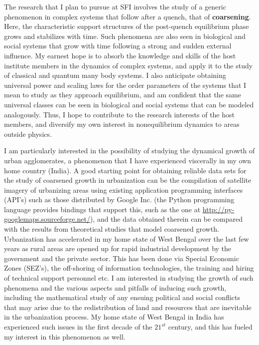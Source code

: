 \documentclass[a4paper,9pt]{article}
\begin{document}
The research that I plan to pursue at SFI involves the study of a generic phenomenon in complex systems that follow after a quench, that of \textbf{coarsening}. Here, the characteristic support structures of the post-quench equilibrium phase grows and stabilizes with time. Such phenomena are also seen in biological and social systems that grow with time following a strong and sudden external influence. My earnest hope is to absorb the knowledge and skills of the host institute members in the dynamics of complex systems, and apply it to the study of classical and quantum many body systems. I also anticipate obtaining universal power and scaling laws for the order parameters of the systems that I mean to study as they approach equilibrium, and am confident that the same universal classes can be seen in biological and social systems that can be modeled analogously. Thus, I hope to contribute to the research interests of the host members, and diversify my own interest in nonequilibrium dynamics to areas outside physics. 

I am particularly interested in the possibility of studying the dynamical growth of urban agglomerates, a phenomenon that I have experienced viscerally in my own home country (India). A good starting point for obtaining reliable data sets for the study of coarsened growth in urbanization can be the compilation of satellite imagery of urbanizing areas using existing application programming interfaces (API's) such as those distributed by Google Inc. (the Python programming language provides bindings that support this, such as the one at \url{http://py-googlemaps.sourceforge.net/}), and the data obtained therein can be compared with the results from theoretical studies that model coarsened growth. Urbanization has accelerated in my home state of West Bengal over the last few years as rural areas are opened up for rapid industrial development by the government and the private sector. This has been done via Special Economic Zones (SEZ's), the off-shoring of information technologies, the training and hiring  of technical support personnel etc. I am interested in studying the growth of such phenomena and the various aspects and pitfalls of inducing such growth, including the mathematical study of any ensuing political and social conflicts that may arise due to the redistribution of land and resources that are inevitable in the urbanization process. My home state of West Bengal in India has experienced such issues in the first decade of the $21^{st}$ century, and this has fueled my interest in this phenomenon as well. 
\end{document}
